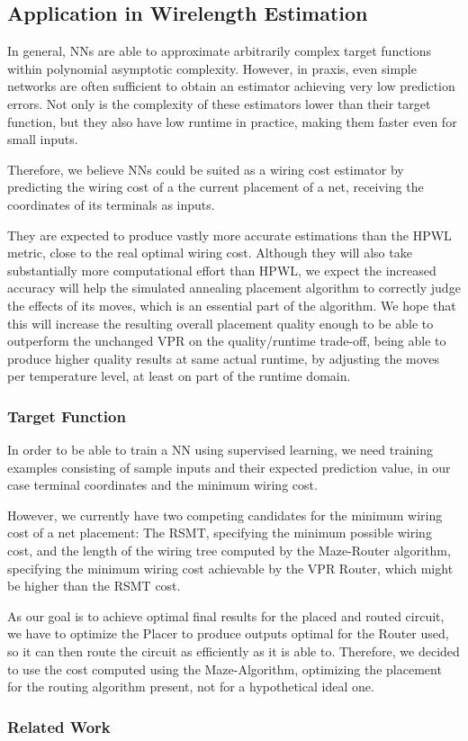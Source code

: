 \subsection{Application in Wirelength Estimation}

In general, \glspl{NN} are able to approximate arbitrarily complex target functions\cite{TODO} within polynomial asymptotic complexity\cite{NN-complexity-web}\cite{TODO}. However, in praxis, even simple networks are often sufficient to obtain an estimator achieving very low prediction errors. Not only is the complexity of these estimators lower than their target function, but they also have low runtime in practice, making them faster even for small inputs.

Therefore, we believe \glspl{NN} could be suited as a wiring cost estimator by predicting the wiring cost of a the current placement of a net, receiving the coordinates of its terminals as inputs. 

They are expected to produce vastly more accurate estimations than the \gls{HPWL} metric, close to the real optimal wiring cost. Although they will also take substantially more computational effort than \gls{HPWL}, we expect the increased accuracy will help the simulated annealing placement algorithm to correctly judge the effects of its moves, which is an essential part of the algorithm. We hope that this will increase the resulting overall placement quality enough to be able to outperform the unchanged \gls{VPR} on the quality/runtime trade-off, being able to produce higher quality results at same actual runtime, by adjusting the moves per temperature level, at least on part of the runtime domain.

\subsubsection{Target Function}

In order to be able to train a \gls{NN} using supervised learning, we need training examples consisting of sample inputs and their expected prediction value, in our case terminal coordinates and the minimum wiring cost.

However, we currently have two competing candidates for the minimum wiring cost of a net placement: The \gls{RSMT}, specifying the minimum possible wiring cost, and the length of the wiring tree computed by the Maze-Router algorithm\cite{Maze-Router}, specifying the minimum wiring cost achievable by the \gls{VPR} Router, which might be higher than the \gls{RSMT} cost.

As our goal is to achieve optimal final results for the placed and routed circuit, we have to optimize the Placer to produce outputs optimal for the Router used, so it can then route the circuit as efficiently as it is able to. Therefore, we decided to use the cost computed using the Maze-Algorithm, optimizing the placement for the routing algorithm present, not for a hypothetical ideal one.

\subsubsection{Related Work}
